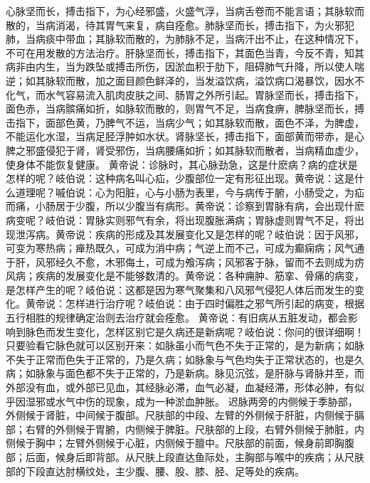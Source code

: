 \documentclass[12pt,UTF8]{ctexbook}
\begin{document}
心脉坚而长，搏击指下，为心经邪盛，火盛气浮，当病舌卷而不能言语；其脉软而散的，当病消渴，待其胃气来复，病自痊愈。肺脉坚而长，搏击指下，为火邪犯肺，当病痰中带血；其脉软而散的，为肺脉不足，当病汗出不止，在这种情况下，不可在用发散的方法治疗。肝脉坚而长，搏击指下，其面色当青，今反不青，知其病非由内生，当为跌坠或搏击所伤，因淤血积于肋下，阻碍肺气升降，所以使人喘逆；如其脉软而散，加之面目颜色鲜泽的，当发溢饮病，溢饮病口渴暴饮，因水不化气，而水气容易流入肌肉皮肤之间、肠胃之外所引起。胃脉坚而长，搏击指下，面色赤，当病髌痛如折，如脉软而散的，则胃气不足，当病食痹，脾脉坚而长，搏击指下，面部色黄，乃脾气不运，当病少气；如其脉软而散，面色不泽，为脾虚，不能运化水湿，当病足胫浮肿如水状。肾脉坚长，搏击指下，面部黄而带赤，是心脾之邪盛侵犯于肾，肾受邪伤，当病腰痛如折；如其脉软而散者，当病精血虚少，使身体不能恢复健康。
黄帝说：诊脉时，其心脉劲急，这是什麽病？病的症状是怎样的呢？岐伯说：这种病名叫心疝，少腹部位一定有形征出现。黄帝说：这是什么道理呢？嘁伯说：心为阳脏，心与小肠为表里，今与病传于腑，小肠受之，为疝而痛，小肠居于少腹，所以少腹当有病形。黄帝说：诊察到胃脉有病，会出现什麽病变呢？岐伯说：胃脉实则邪气有余，将出现腹胀满病；胃脉虚则胃气不足，将出现泄泻病。黄帝说：疾病的形成及其发展变化又是怎样的呢？岐伯说：因于风邪，可变为寒热病；瘅热既久，可成为消中病；气逆上而不己，可成为癫痫病；风气通于肝，风邪经久不愈，木邪侮土，可成为飧泻病；风邪客于脉，留而不去则成为疠风病；疾病的发展变化是不能够数清的。黄帝说：各种痈肿、筋挛、骨痛的病变，是怎样产生的呢？岐伯说：这都是因为寒气聚集和八风邪气侵犯人体后而发生的变化。黄帝说：怎样进行治疗呢？岐伯说：由于四时偏胜之邪气所引起的病变，根据五行相胜的规律确定治则去治疗就会痊愈。
黄帝说：有旧病从五脏发动，都会影响到脉色而发生变化，怎样区别它是久病还是新病呢？岐伯说：你问的很详细啊！只要验看它脉色就可以区别开来：如脉虽小而气色不失于正常的，是为新病；如脉不失于正常而色失于正常的，乃是久病；如脉象与气色均失于正常状态的，也是久病；如脉象与面色都不失于正常的，乃是新病。脉见沉弦，是肝脉与肾脉并至，而外部没有血，或外部已见血，其经脉必滞，血气必凝，血凝经滞，形体必肿，有似乎因湿邪或水气中伤的现象，成为一种淤血肿胀。
迟脉两旁的内侧候于季胁部，外侧候于肾脏，中间候于腹部。尺肤部的中段、左臂的外侧候于肝脏，内侧候于膈部；右臂的外侧候于胃腑，内侧候于脾脏。尺肤部的上段，右臂外侧候于肺脏，内侧候于胸中；左臂外侧候于心脏，内侧候于膻中。尺肤部的前面，候身前即胸腹部；后面，候身后即背部。从尺肤上段直达鱼际处，主胸部与喉中的疾病；从尺肤部的下段直达肘横纹处，主少腹、腰、股、膝、胫、足等处的疾病。
\end{document}
